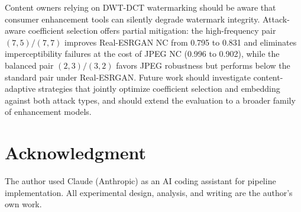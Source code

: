 \documentclass[conference]{IEEEtran}
\begin{document}
Content owners relying on DWT-DCT watermarking should be aware that
consumer enhancement tools can silently degrade watermark integrity.
Attack-aware coefficient selection offers partial mitigation: the
high-frequency pair $(7,5)/(7,7)$ improves Real-ESRGAN NC from 0.795 to
0.831 and eliminates imperceptibility failures at the cost of JPEG NC
(0.996 to 0.902), while the balanced pair $(2,3)/(3,2)$ favors JPEG
robustness but performs below the standard pair under Real-ESRGAN.
Future work should investigate content-adaptive strategies that jointly
optimize coefficient selection and embedding against both attack types,
and should extend the evaluation to a broader family of enhancement
models.

\section*{Acknowledgment}
The author used Claude (Anthropic) as an AI coding assistant for
pipeline implementation. All experimental design, analysis, and writing
are the author's own work.



\end{document}
